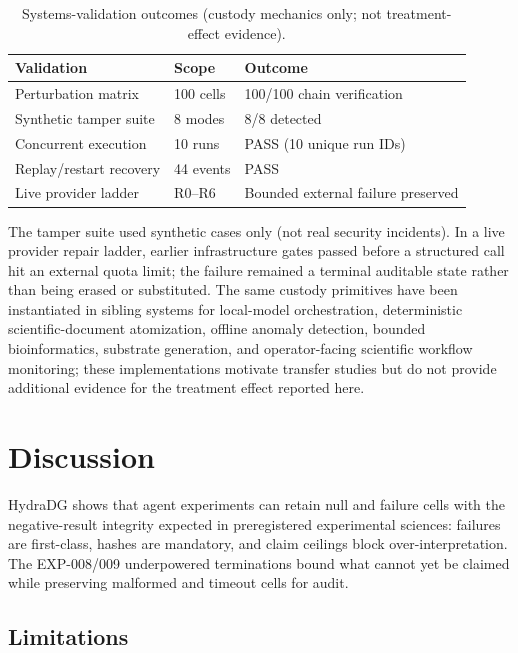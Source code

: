 \documentclass{article}
\begin{document}
\begin{table}[t]
  \centering
  \caption{Systems-validation outcomes (custody mechanics only; not treatment-effect evidence).}
  \label{tab:systems}
  \begin{tabular}{lll}
    \toprule
    Validation & Scope & Outcome \\
    \midrule
    Perturbation matrix & 100 cells & 100/100 chain verification \\
    Synthetic tamper suite & 8 modes & 8/8 detected \\
    Concurrent execution & 10 runs & PASS (10 unique run IDs) \\
    Replay/restart recovery & 44 events & PASS \\
    Live provider ladder & R0--R6 & Bounded external failure preserved \\
    \bottomrule
  \end{tabular}
\end{table}

The tamper suite used synthetic cases only (not real security incidents).
In a live provider repair ladder, earlier infrastructure gates passed before a structured call hit an external quota limit; the failure remained a terminal auditable state rather than being erased or substituted.
The same custody primitives have been instantiated in sibling systems for local-model orchestration, deterministic scientific-document atomization, offline anomaly detection, bounded bioinformatics, substrate generation, and operator-facing scientific workflow monitoring; these implementations motivate transfer studies but do not provide additional evidence for the treatment effect reported here.

\section{Discussion}

HydraDG shows that agent experiments can retain null and failure cells with the negative-result integrity expected in preregistered experimental sciences: failures are first-class, hashes are mandatory, and claim ceilings block over-interpretation.
The EXP-008/009 underpowered terminations bound what cannot yet be claimed while preserving malformed and timeout cells for audit.

\subsection{Limitations}
\label{sec:limitations}
\end{document}
